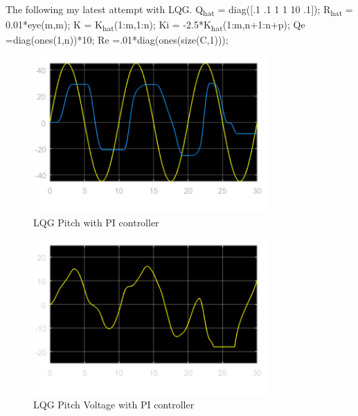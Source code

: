 \documentclass[fontsize=11pt, %
                             paper=letter, %
                             openany, %
                             captions=tableheading,
                             index=totoc,
                             hyperref]{labbook}
\begin{document}
\begin{addmargin}[0cm]{0cm}
The following my latest attempt with LQG.\newline
Q\textsubscript{hat} = diag($[$.1 .1 1 1 10 .1$]$);\newline
R\textsubscript{hat} = 0.01*eye(m,m);\newline
K = K\textsubscript{hat}(1:m,1:n);\newline
Ki = -2.5*K\textsubscript{hat}(1:m,n+1:n+p);\newline
Qe =diag(ones(1,n))*10;\newline
Re =.01*diag(ones(size(C,1)));\newline

\begin{figure}
  \centering
  \includegraphics[width=0.8\textwidth]{figs/img/02152019/LQG_Pitch02152019.png}
  \caption{LQG Pitch with PI controller}
  \label{fig:LQG_PI_Pitch}
\end{figure}

\begin{figure}
  \centering
  \includegraphics[width=0.8\textwidth]{figs/img/02152019/LQG_PitchVolt02152019.png}
  \caption{LQG Pitch Voltage with PI controller}
  \label{fig:LQG_PI_PitchVolt}
\end{figure}


\end{addmargin}
\end{document}
